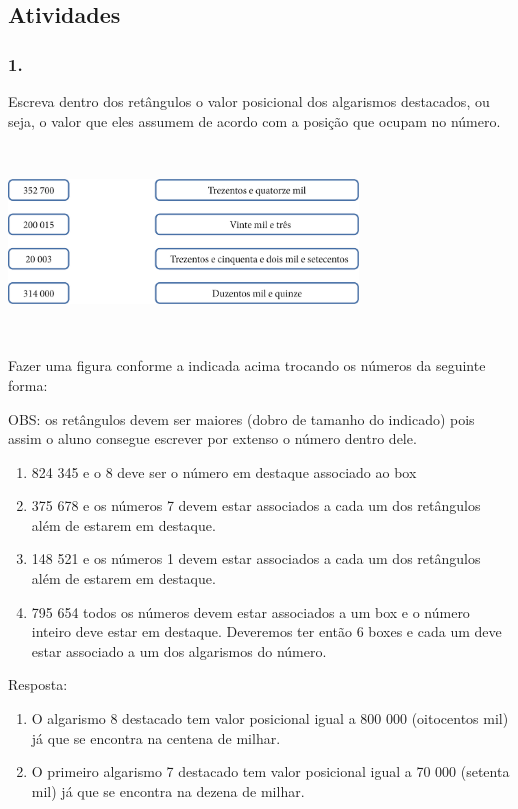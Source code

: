 \subsection{Atividades}\label{atividades}

\subsubsection{1.}\label{section}

Escreva dentro dos retângulos o valor posicional dos algarismos
destacados, ou seja, o valor que eles assumem de acordo com a posição
que ocupam no número.

\includegraphics[width=3.65385in,height=2.00568in]{media/image6.png}

Fazer uma figura conforme a indicada acima trocando os números da
seguinte forma:

OBS: os retângulos devem ser maiores (dobro de tamanho do indicado) pois
assim o aluno consegue escrever por extenso o número dentro dele.

\begin{enumerate}
\def\labelenumi{\alph{enumi})}
\item
  824 345 e o 8 deve ser o número em destaque associado ao box
\item
  375 678 e os números 7 devem estar associados a cada um dos retângulos
  além de estarem em destaque.
\item
  148 521 e os números 1 devem estar associados a cada um dos retângulos
  além de estarem em destaque.
\item
  795 654 todos os números devem estar associados a um box e o número
  inteiro deve estar em destaque. Deveremos ter então 6 boxes e cada um
  deve estar associado a um dos algarismos do número.
\end{enumerate}

Resposta:

\begin{enumerate}
\def\labelenumi{\alph{enumi})}
\item
  O algarismo 8 destacado tem valor posicional igual a 800 000
  (oitocentos mil) já que se encontra na centena de milhar.
\item
  O primeiro algarismo 7 destacado tem valor posicional igual a 70 000
  (setenta mil) já que se encontra na dezena de milhar.
\end{enumerate}

